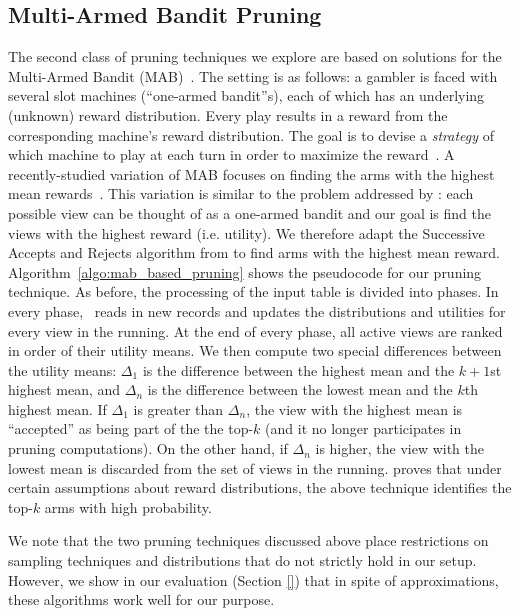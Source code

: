 \subsection{Multi-Armed Bandit Pruning}
\label{sec:multi_armed_bandit}
The second class of pruning techniques we explore
are based on solutions for the Multi-Armed Bandit (MAB)~\cite{bandits}. 
The setting is as follows: a gambler is faced with several slot
machines (``one-armed bandit''s), each of which has an underlying 
(unknown) reward distribution. 
Every play results in a reward from the corresponding machine's
reward distribution.
The goal is to devise a {\it strategy} of which machine to play
at each turn in order to maximize the reward~\cite{bandits}.
A recently-studied variation of MAB focuses on finding the arms with the highest
mean rewards~\cite{BubeckWV13}.
This variation is similar to the problem addressed by \SeeDB: each possible view 
can be thought of as a one-armed bandit and our goal is find the views with the 
highest reward (i.e. utility).
We therefore adapt the Successive Accepts and Rejects algorithm from \cite{BubeckWV13} 
to find arms with the highest mean reward. 
Algorithm~\ref{algo:mab_based_pruning} shows the pseudocode for our pruning technique.
As before, the processing of the input table is divided into phases.
In every phase, \SeeDB\ reads in new records and updates the distributions and utilities
for every view in the running.
At the end of every phase, all active views are ranked in order of their utility means. 
We then compute two special differences between the utility means: $\Delta_1$
is the difference between the highest mean and the $k+1$st highest mean, and
$\Delta_n$ is the difference between the lowest mean and the $k$th highest mean.
If $\Delta_1$ is greater than $\Delta_n$, the view with the highest mean is
``accepted'' as being part of the the top-$k$ (and it no longer participates
in pruning computations).
On the other hand, if $\Delta_n$ is higher, the view with the lowest mean is discarded
from the set of views in the running.
\cite{BubeckWV13} proves that under certain assumptions about reward distributions,
the above technique identifies the top-$k$ arms with high probability.

We note that the two pruning techniques discussed above place restrictions on sampling
techniques and distributions that do not strictly hold in our setup. 
However, we show in our evaluation (Section \ref{}) that in spite of approximations, 
these algorithms work well for our purpose. 

